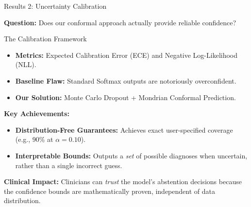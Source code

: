\documentclass[aspectratio=169]{beamer}
\begin{document}
\begin{frame}{Results 2: Uncertainty Calibration}
  
  \textbf{Question:} Does our conformal approach actually provide reliable confidence?
  
  \vspace{0.2cm}
  
  \begin{block}{The Calibration Framework}
    \begin{itemize}
      \item \textbf{Metrics:} Expected Calibration Error (ECE) and Negative Log-Likelihood (NLL).
      \item \textbf{Baseline Flaw:} Standard Softmax outputs are notoriously overconfident.
      \item \textbf{Our Solution:} Monte Carlo Dropout + Mondrian Conformal Prediction.
    \end{itemize}
  \end{block}
  
  \vspace{0.2cm}
  
  \textbf{Key Achievements:}
  \begin{itemize}
      \item \textbf{Distribution-Free Guarantees:} Achieves exact user-specified coverage (e.g., 90\% at $\alpha=0.10$).
      \item \textbf{Interpretable Bounds:} Outputs a \emph{set} of possible diagnoses when uncertain, rather than a single incorrect guess.
  \end{itemize}
  
  \vspace{0.2cm}
  
  \textbf{Clinical Impact:} Clinicians can \emph{trust} the model's abstention decisions because the confidence bounds are mathematically proven, independent of data distribution.
  
\end{frame}
\end{document}
